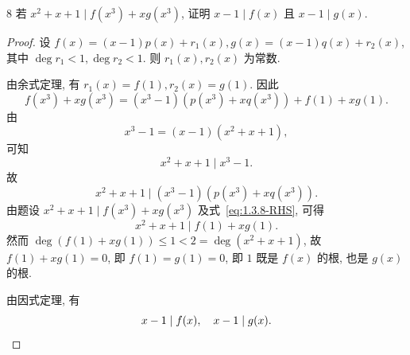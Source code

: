 \begin{ex}{8}\label{ex:1.3.8}
    若 \(x^2+x+1\mid f(x^3)+xg(x^3)\), 证明 \(x-1\mid f(x)\) 且 \(x-1\mid g(x)\).
\end{ex}

\begin{proof}
    设 \(f(x)=(x-1)p(x)+r_1(x), g(x)=(x-1)q(x)+r_2(x)\), 其中 \(\deg r_1<1,\deg r_2<1\).
    则 \(r_1(x),r_2(x)\) 为常数.
    
    由余式定理, 有 \(r_1(x)=f(1),r_2(x)=g(1)\). 因此
    \begin{equation}
        f(x^3)+xg(x^3)=(x^3-1)(p(x^3)+xq(x^3))+f(1)+xg(1).
        \label{eq:1.3.8-RHS}
    \end{equation}
    由
    \[
    x^3-1=(x-1)(x^2+x+1),
    \]
    可知
    \[
    x^2+x+1\mid x^3-1.
    \]
    故
    \[
    x^2+x+1\mid(x^3-1)(p(x^3)+xq(x^3)).
    \]
    由题设 \(x^2+x+1\mid f(x^3)+xg(x^3)\) 及式~\eqref{eq:1.3.8-RHS}, 可得
    \[
    x^2+x+1\mid f(1)+xg(1).
    \]
    然而 \(\deg(f(1)+xg(1))\leq1<2=\deg(x^2+x+1)\), 故 \(f(1)+xg(1)=0\),
    即 \(f(1)=g(1)=0\), 即 \(1\) 既是 \(f(x)\) 的根, 也是 \(g(x)\) 的根.
    
    由因式定理, 有
    \[
    x-1\mid f(x), \quad x-1\mid g(x).\qedhere
    \]
\end{proof}
